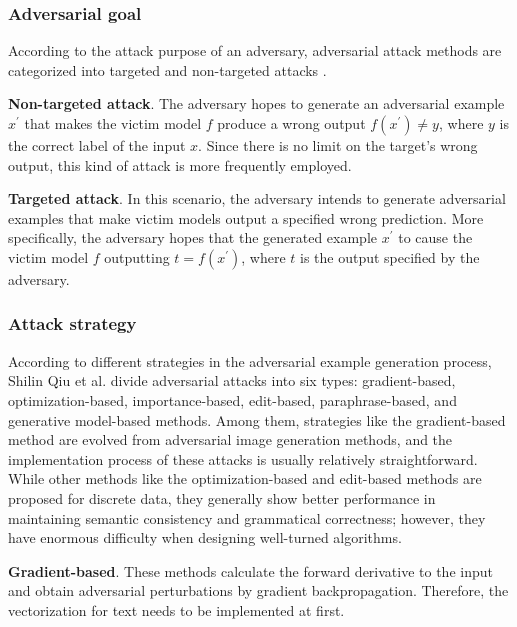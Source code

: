\subsubsection{Adversarial goal}\label{subsubsec:adversarial-goal}

According to the attack purpose of an adversary, adversarial
attack methods are categorized into targeted and non-targeted attacks \cite{QIU2022278}.

\textbf{Non-targeted attack}. The adversary hopes to generate an adversarial example $x^\prime$ that makes the victim model $f$ produce a wrong output $f(x^\prime) \neq y$, where $y$ is the correct label of the input $x$. Since there is no limit on the target's wrong output, this kind of attack is more frequently employed.

\textbf{Targeted attack}. In this scenario, the adversary intends to generate adversarial examples that make victim models output a specified wrong prediction. More specifically, the adversary hopes that the generated example $x^\prime$ to cause the victim model $f$ outputting $t=f(x^\prime)$, where $t$ is the output specified by the adversary.

\subsubsection{Attack strategy}\label{subsubsec:attack-strategy}

According to different strategies in the adversarial example generation process, Shilin Qiu et al. \cite{QIU2022278} divide adversarial attacks into six types: gradient-based, optimization-based, importance-based, edit-based, paraphrase-based, and generative model-based methods. Among them, strategies like the gradient-based method are evolved from adversarial image generation methods, and the implementation process of these attacks is usually relatively straightforward. While other methods like the optimization-based and edit-based methods are proposed for discrete data, they generally show better performance in maintaining semantic consistency and grammatical correctness; however, they have enormous difficulty when designing well-turned algorithms.

\textbf{Gradient-based}. These methods calculate the forward derivative to the input and obtain adversarial perturbations by gradient backpropagation. Therefore, the vectorization for text needs to be implemented at first.

